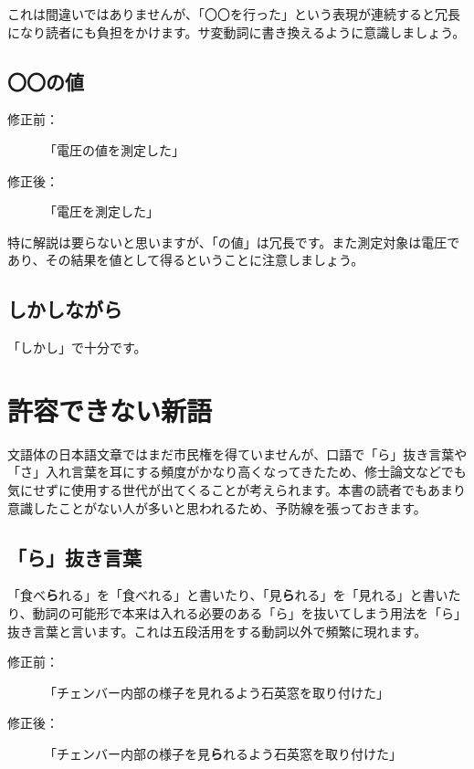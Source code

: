これは間違いではありませんが、「〇〇を行った」という表現が連続すると冗長になり読者にも負担をかけます。サ変動詞に書き換えるように意識しましょう。


\subsection{〇〇の値}

\begin{description}
\item[修正前：]「電圧の値を測定した」
\item[修正後：]「電圧を測定した」
\end{description}

特に解説は要らないと思いますが、「の値」は冗長です。また測定対象は電圧であり、その結果を値として得るということに注意しましょう。

\subsection{しかしながら}

「しかし」で十分です。

\section{許容できない新語}

文語体の日本語文章ではまだ市民権を得ていませんが、口語で「ら」抜き言葉や「さ」入れ言葉を耳にする頻度がかなり高くなってきたため、修士論文などでも気にせずに使用する世代が出てくることが考えられます。本書の読者でもあまり意識したことがない人が多いと思われるため、予防線を張っておきます。

\subsection{「ら」抜き言葉}

「食べ{\bf ら}れる」を「食べれる」と書いたり、「見{\bf ら}れる」を「見れる」と書いたり、動詞の可能形で本来は入れる必要のある「ら」を抜いてしまう用法を「ら」抜き言葉と言います。これは五段活用をする動詞以外で頻繁に現れます。

\begin{description}
\item[修正前：]「チェンバー内部の様子を見れるよう石英窓を取り付けた」
\item[修正後：]「チェンバー内部の様子を見{\bf ら}れるよう石英窓を取り付けた」
\end{description}


